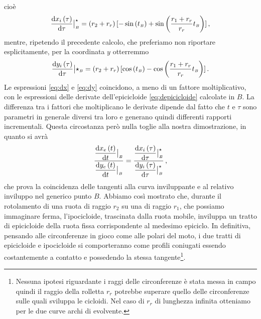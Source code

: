 \noindent cio\`e
\begin{equation}
\dfrac{{\rm d}{x_i}\left(\tau\right)}{{\rm d}\tau}\bigr|^\star_{\scriptscriptstyle B} = 
\left(r_2+r_r\right)[-\sin\left(t_{\scriptscriptstyle B}\right) +
\sin\left(\dfrac{r_1+r_r}{r_r}t_{\scriptscriptstyle B}\right)]\,,
\label{eq:dx}
\end{equation}
\noindent mentre, ripetendo il precedente calcolo, che preferiamo non riportare
esplicitamente, per la coordinata $y$ otterremmo
\begin{equation}
\dfrac{{\rm d}{y_i}\left(\tau\right)}{{\rm d}\tau}\bigr|\star_{\scriptscriptstyle B} = 
\left(r_2+r_r\right)[\cos\left(t_{\scriptscriptstyle B}\right) -
\cos\left(\dfrac{r_1+r_r}{r_r}t_{\scriptscriptstyle B}\right)]\,.
\label{eq:dy}
\end{equation}
\noindent Le espressioni \ref{eq:dx} e \ref{eq:dy} coincidono, a meno di
un fattore moltiplicativo, con le espressioni
delle derivate dell'epicicloide \ref{eq:depicicloide} calcolate in $B$.
La differenza tra i fattori che moltiplicano le derivate
dipende dal fatto che $t$ e $\tau$ sono parametri in generale diversi tra
loro e generano quindi differenti rapporti incrementali.
Questa circostanza per\`o nulla toglie alla nostra dimostrazione, in quanto si
avr\`a
\begin{equation}
\dfrac{\dfrac{{\rm d}{x_e}\left(t\right)}{{\rm d}t}\bigr|_{\scriptscriptstyle B}}{\dfrac{{\rm d}{y_e}\left(t\right)}{{\rm d}t}\bigr|_{\scriptscriptstyle B}} =
\dfrac{\dfrac{{\rm d}{x_i}\left(\tau\right)}{{\rm d}\tau}\bigr|^\star_{\scriptscriptstyle B}}
{\dfrac{{\rm d}{y_i}\left(\tau\right)}{{\rm d}\tau}\bigr|^\star_{\scriptscriptstyle B}} \,,
\label{eq:dtot}
\end{equation}
\noindent che prova la coincidenza delle tangenti alla curva inviluppante e
al relativo inviluppo nel generico punto $B$.
Abbiamo cos\`i mostrato che, durante il rotolamento di una ruota di
raggio $r_2$ su una di raggio $r_1$, che possiamo immaginare ferma,
l'ipocicloide, trascinata dalla ruota mobile, inviluppa un tratto di epicicloide
della ruota fissa corrispondente al medesimo epiciclo.
In definitiva, pensando alle circonferenze in gioco come alle polari del moto,
i due tratti di epicicloide e ipocicloide si comporteranno come profili
coniugati essendo costantemente a contatto e possedendo la stessa
tangente\footnote{
Nessuna ipotesi riguardante i raggi delle circonferenze \`e stata messa in campo
quindi il raggio della rolletta $r_r$ potrebbe superare quello delle
circonferenze sulle quali sviluppa le cicloidi. Nel caso di
 $r_r$ di lunghezza infinita otteniamo per le due curve archi di evolvente.
}.

